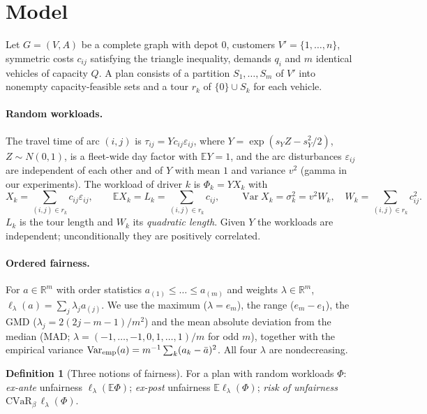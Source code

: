 \documentclass[11pt]{article}
\theoremstyle{definition}
\newtheorem{definition}[theorem]{Definition}
\newcommand{\E}{\mathbb{E}}
\newcommand{\lord}{\ell_\lambda}
\begin{document}
\section{Model}\label{sec:model}

Let $G=(V,A)$ be a complete graph with depot $0$, customers $V'=\{1,\dots,n\}$,
symmetric costs $c_{ij}$ satisfying the triangle inequality, demands $q_i$ and
$m$ identical vehicles of capacity $Q$. A plan consists of a partition
$S_1,\dots,S_m$ of $V'$ into nonempty capacity-feasible sets and a tour $r_k$ of
$\{0\}\cup S_k$ for each vehicle.

\paragraph{Random workloads.} The travel time of arc $(i,j)$ is
$\tau_{ij}=Y c_{ij}\varepsilon_{ij}$, where $Y=\exp(s_Y Z-s_Y^2/2)$, $Z\sim N(0,1)$, is a
fleet-wide day factor with $\E Y=1$, and the arc disturbances
$\varepsilon_{ij}$ are independent of each other and of $Y$ with mean $1$ and
variance $v^2$ (gamma in our experiments). The workload of driver $k$ is
$\Phi_k = Y X_k$ with
\[
X_k=\sum_{(i,j)\in r_k} c_{ij}\varepsilon_{ij},\qquad \E X_k = L_k=\sum_{(i,j)\in r_k} c_{ij},\qquad
\operatorname{Var}X_k=\sigma_k^2=v^2W_k,\quad W_k=\sum_{(i,j)\in r_k}c_{ij}^2 .
\]
$L_k$ is the tour length and $W_k$ its \emph{quadratic length}. Given $Y$ the
workloads are independent; unconditionally they are positively correlated.

\paragraph{Ordered fairness.} For $a\in\mathbb{R}^m$ with order statistics
$a_{(1)}\le\dots\le a_{(m)}$ and weights $\lambda\in\mathbb{R}^m$,
$\lord(a)=\sum_j\lambda_j a_{(j)}$. We use the maximum ($\lambda=e_m$), the
range ($e_m-e_1$), the GMD ($\lambda_j=2(2j-m-1)/m^2$) and the mean absolute
deviation from the median (MAD; $\lambda=(-1,\dots,-1,0,1,\dots,1)/m$ for odd
$m$), together with the empirical variance
$\operatorname{Var}_{\rm emp}(a)=m^{-1}\sum_k(a_k-\bar a)^2$. All four $\lambda$
are nondecreasing.

\begin{definition}[Three notions of fairness]
For a plan with random workloads $\Phi$: \emph{ex-ante} unfairness
$\lord(\E\Phi)$; \emph{ex-post} unfairness $\E\lord(\Phi)$; \emph{risk of
unfairness} $\mathrm{CVaR}_\beta\,\lord(\Phi)$.
\end{definition}
\end{document}
